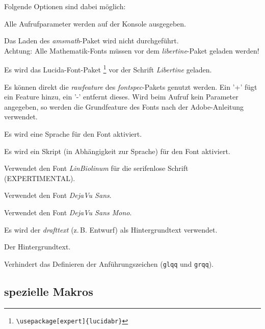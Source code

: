\documentclass{fontdoku}
\begin{document}
Folgende Optionen sind dabei möglich:
\begin{description}
\item [debug] Alle Aufrufparameter werden auf der Konsole ausgegeben.
\item [noamsmath] Das Laden des \emph{amsmath}-Paket wird nicht durchgeführt.\\
      Achtung: Alle Mathematik-Fonts müssen vor dem \emph{libertine}-Paket
      geladen werden!
\item [lucida] Es wird das Lucida-Font-Paket%
      \footnote{\texttt{\textbackslash usepackage[expert]\{lucidabr\}}}
      vor der Schrift \emph{Libertine} geladen.
\item [rawfeature] Es können direkt die \emph{rawfeature} des \emph{fontspec}-Pakets genutzt werden.
      Ein '+' fügt ein Feature hinzu, ein '-' entfernt dieses. Wird beim Aufruf kein Parameter angegeben, so werden die Grundfeature des Fonts nach der Adobe-Anleitung verwendet.
\item [language] Es wird eine Sprache für den Font aktiviert.
\item [script]   Es wird ein Skript (in Abhängigkeit zur Sprache) für den Font aktiviert.
\item [biolinum] Verwendet den Font \emph{LinBiolinum} für die serifenlose Schrift
                 (EXPERTIMENTAL).
\item [dejavusans] Verwendet den Font \emph{DejaVu Sans}.
\item [dejavusansmono] Verwendet den Font \emph{DejaVu Sans Mono}.
\item [draft] Es wird der \emph{drafttext} (z.\,B. Entwurf) als Hintergrundtext verwendet.
\item [drafttext] Der Hintergrundtext.
\item [noquotes] Verhindert das Definieren der Anführungszeichen (\texttt{glqq} und \texttt{grqq}).
\end{description}

\newpage
\subsection{spezielle Makros}
\end{document}

